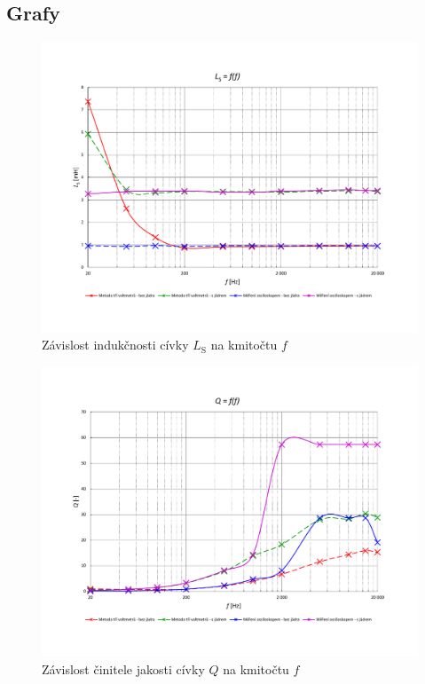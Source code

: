 \documentclass[a4paper, czech]{article}
\begin{document}
\subsection{Grafy}

\begin{figure}[H]
    \centering
    \includegraphics[width=\textwidth, trim={0 2.5cm 0 3cm}]{grafy/9B_graf1.pdf}
    \caption{Závislost indukčnosti cívky $L_\text{S}$ na kmitočtu $f$}
\end{figure}

\begin{figure}[H]
    \centering
    \includegraphics[width=\textwidth, trim={0 2.5cm 0 3cm}]{grafy/9B_graf2.pdf}
    \caption{Závislost činitele jakosti cívky $Q$ na kmitočtu $f$}
\end{figure}
\end{document}
